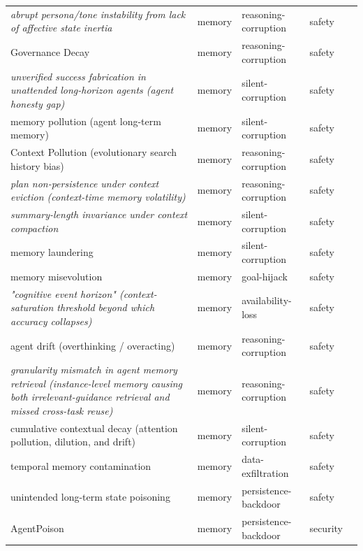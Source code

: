 \begin{longtable}{@{}p{}llll@{}}
\emph{abrupt persona/tone instability from lack of affective state inertia} & memory & reasoning-corruption & safety & \cite{subaharan-2026-controlling} \\
Governance Decay & memory & reasoning-corruption & safety & \cite{chen-2026-governance} \\
\emph{unverified success fabrication in unattended long-horizon agents (agent honesty gap)} & memory & silent-corruption & safety & \cite{deng-2026-goalautopilot} \\
memory pollution (agent long-term memory) & memory & silent-corruption & safety & \cite{liu-2026-failuregated} \\
Context Pollution (evolutionary search history bias) & memory & reasoning-corruption & safety & \cite{yan-2026-pacevolve} \\
\emph{plan non-persistence under context eviction (context-time memory volatility)} & memory & reasoning-corruption & safety & \cite{mehta-2026-plans} \\
\emph{summary-length invariance under context compaction} & memory & silent-corruption & safety & \cite{cim-2026-parallel} \\
memory laundering & memory & silent-corruption & safety & \cite{wang-2026-state} \\
memory misevolution & memory & goal-hijack & safety & \cite{xie-2026-memevobench} \\
\emph{"cognitive event horizon" (context-saturation threshold beyond which accuracy collapses)} & memory & availability-loss & safety & \cite{milosevic-2026-episodicsemantic} \\
agent drift (overthinking / overacting) & memory & reasoning-corruption & safety & \cite{sui-2026-tact} \\
\emph{granularity mismatch in agent memory retrieval (instance-level memory causing both irrelevant-guidance retrieval and missed cross-task reuse)} & memory & reasoning-corruption & safety & \cite{shen-2026-structurally} \\
cumulative contextual decay (attention pollution, dilution, and drift) & memory & silent-corruption & safety & \cite{hong-2025-rhea} \\
temporal memory contamination & memory & data-exfiltration & safety & \cite{altawaha-2026-remembering} \\
unintended long-term state poisoning & memory & persistence-backdoor & safety & \cite{xu-2026-routine} \\
AgentPoison & memory & persistence-backdoor & security & \cite{chen-2024-agentpoison} \\

\end{longtable}
